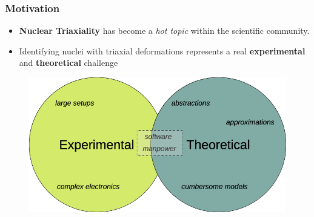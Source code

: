\documentclass{beamer}
\begin{document}
\begin{frame}
	\frametitle{Motivation}
    \vspace{-0.3cm}
    \begin{itemize}
        \item \textbf{Nuclear Triaxiality} has become a \emph{hot topic} within the scientific community.
        \item Identifying nuclei with triaxial deformations represents a real \textbf{experimental} and \textbf{theoretical} challenge
    \end{itemize}
    \vspace{-0.2cm}
    \begin{figure}
        \centering
        \includegraphics[scale=0.35]{figures/exp_vs_theory.png}
    \end{figure}
\end{frame}
\end{document}
